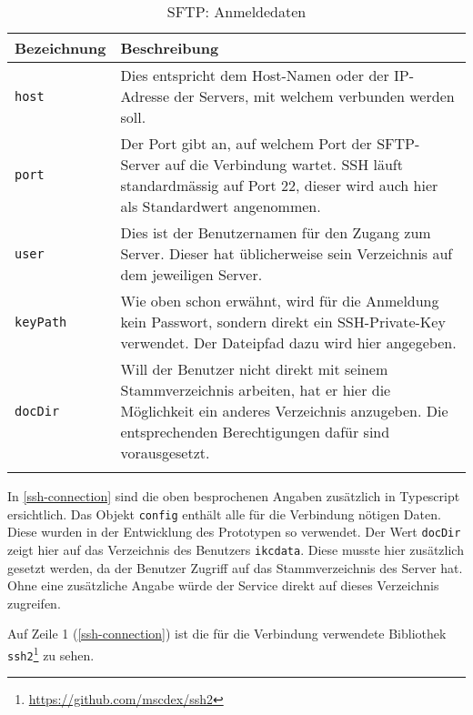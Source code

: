 \begin{longtable}{|p{4cm}| p{8cm}|}
  \hline
    \textbf{Bezeichnung} & \textbf{Beschreibung}\\\hline
    \texttt{host} & Dies entspricht dem Host-Namen oder der IP-Adresse der Servers, mit welchem verbunden werden soll.\\\hline
    \texttt{port} & Der Port gibt an, auf welchem Port der \gls{SFTP}-Server auf die Verbindung wartet. \gls{SSH} läuft standardmässig auf Port 22, dieser wird auch hier als Standardwert angenommen.\\\hline
    \texttt{user} & Dies ist der Benutzernamen für den Zugang zum Server. Dieser hat üblicherweise sein Verzeichnis auf dem jeweiligen Server.\\\hline
    \texttt{keyPath} & Wie oben schon erwähnt, wird für die Anmeldung kein Passwort, sondern direkt ein SSH-Private-Key verwendet. Der Dateipfad dazu wird hier angegeben.\\\hline
    \texttt{docDir} & Will der Benutzer nicht direkt mit seinem Stammverzeichnis arbeiten, hat er hier die Möglichkeit ein anderes Verzeichnis anzugeben. Die entsprechenden Berechtigungen dafür sind vorausgesetzt.\\\hline
        \caption{SFTP: Anmeldedaten}
    \label{sftp-anmeldung}
\end{longtable}


In \autoref{ssh-connection} sind die oben besprochenen Angaben zusätzlich in \gls{Typescript} ersichtlich. Das Objekt \texttt{config} enthält alle für die Verbindung nötigen Daten. Diese wurden in der Entwicklung des Prototypen so verwendet. Der Wert \texttt{docDir} zeigt hier auf das Verzeichnis des Benutzers \texttt{ikcdata}. Diese musste hier zusätzlich gesetzt werden, da der Benutzer Zugriff auf das Stammverzeichnis des Server hat. Ohne eine zusätzliche Angabe würde der Service direkt auf dieses Verzeichnis zugreifen.



Auf Zeile 1 (\autoref{ssh-connection}) ist die für die Verbindung verwendete Bibliothek \texttt{ssh2}\footnote{\url{https://github.com/mscdex/ssh2}} zu sehen.



